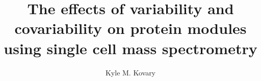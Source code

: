 \documentclass[12pt]{report}
\begin{document}
\title{The effects of variability and covariability on protein modules using single cell mass spectrometry}
\author{Kyle M. Kovary}
 

\beforepreface


\afterpreface



% 



\onlinesignature
\end{document}
